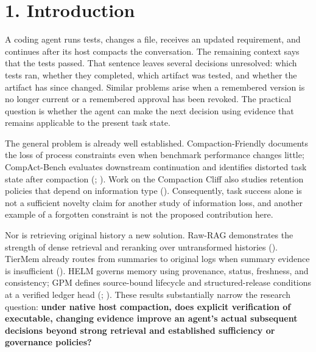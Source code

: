 \documentclass[
  11pt,
  a4paper,
]{article}
\begin{document}
\clearpage

\section{1. Introduction}\label{introduction}

A coding agent runs tests, changes a file, receives an updated
requirement, and continues after its host compacts the conversation. The
remaining context says that the tests passed. That sentence leaves
several decisions unresolved: which tests ran, whether they completed,
which artifact was tested, and whether the artifact has since changed.
Similar problems arise when a remembered version is no longer current or
a remembered approval has been revoked. The practical question is
whether the agent can make the next decision using evidence that remains
applicable to the present task state.

The general problem is already well established. Compaction-Friendly
documents the loss of process constraints even when benchmark
performance changes little; CompAct-Bench evaluates downstream
continuation and identifies distorted task state after compaction
(;
). Work on the
Compaction Cliff also studies retention policies that depend on
information type (). Consequently, task success alone is not
a sufficient novelty claim for another study of information loss, and
another example of a forgotten constraint is not the proposed
contribution here.

Nor is retrieving original history a new solution. Raw-RAG demonstrates
the strength of dense retrieval and reranking over untransformed
histories (). TierMem
already routes from summaries to original logs when summary evidence is
insufficient (). HELM
governs memory using provenance, status, freshness, and consistency; GPM
defines source-bound lifecycle and structured-release conditions at a
verified ledger head (;
). These results substantially
narrow the research question: \textbf{under native host compaction, does
explicit verification of executable, changing evidence improve an
agent's actual subsequent decisions beyond strong retrieval and
established sufficiency or governance policies?}
\end{document}
